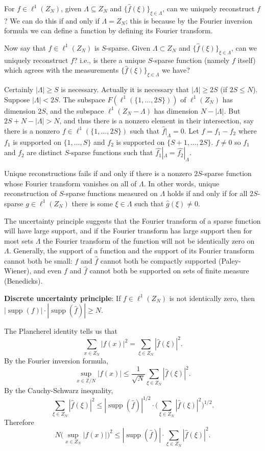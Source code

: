 \documentclass{article}
\DeclareMathOperator{\supp}{supp}
\begin{document}
For $f \in \ell^1(Z_N)$, given $\Lambda \subseteq Z_N$
and $\{\hat{f}(\xi)\}_{\xi \in \Lambda}$,
can we uniquely reconstruct $f$? We can do this if and only if
$\Lambda=Z_N$; this is because by the Fourier inversion formula
we can define a function by defining its Fourier transform.

Now say that $f \in \ell^1(Z_N)$ is $S$-sparse. Given 
$\Lambda \subset Z_N$ and $\{\hat{f}(\xi)\}_{\xi \in \Lambda}$,
can we uniquely reconstruct $f$? i.e., is there a unique $S$-sparse
function (namely $f$ itself) which agrees with the measurements
$\{\hat{f}(\xi)\}_{\xi \in \Lambda}$ we have?

Certainly $|\Lambda| \geq S$ is necessary. Actually
it is necessary that $|\Lambda|\geq 2S$ (if $2S \leq N$).
Suppose $|\Lambda|<2S$.
The subspace $F(\ell^1(\{1,\ldots,2S\}))$ of $\ell^1(Z_N)$
has dimension $2S$, and the subspace $\ell^1(Z_N-\Lambda)$ has
dimension $N-|\Lambda|$. 
But $2S+N-|\Lambda|>N$, and thus there is a nonzero
element in their intersection, say there is a nonzero $f \in \ell^1(\{1,\ldots,2S\})$ such that $\hat{f}|_{\Lambda}=0$.
Let $f=f_1-f_2$ where $f_1$ is supported on $\{1,\ldots,S\}$ and
$f_2$ is supported on $\{S+1,\ldots,2S\}$. $f \neq 0$ so $f_1$ and $f_2$
are distinct $S$-sparse functions such that $\hat{f_1}|_{\Lambda}
=\hat{f_2}|_{\Lambda}$.

Unique reconstructions fails if and only if there is a nonzero
$2S$-sparse function whose Fourier transform vanishes on all of $\Lambda$.
In other words,
unique reconstruction of $S$-sparse functions measured
on $\Lambda$ holds if and only if for all $2S$-sparse $g \in \ell^1(Z_N)$
there is some $\xi \in \Lambda$ such that $\hat{g}(\xi) \neq 0$.

The uncertainty principle suggests that the Fourier transform of
a
sparse function will have large support, and if the Fourier transform
has large support then for most sets $\Lambda$ the Fourier transform
of the function will not be identically zero on $\Lambda$.
Generally, the support of a function and the support of its Fourier
transform cannot both be small: $f$ and $\hat{f}$
cannot both be compactly supported (Paley-Wiener),
and even $f$ and $\hat{f}$ cannot both be supported on sets
of finite measure (Benedicks).

\textbf{Discrete uncertainty principle}: If $f \in \ell^1(Z_N)$ is not
identically zero, then $|\supp(f)|\cdot |\supp(\hat{f})| \geq N$.

The Plancherel identity tells us that
\[
\sum_{x \in Z_N} |f(x)|^2 = \sum_{\xi \in Z_N}|\hat{f}(\xi)|^2.
\]
By the Fourier inversion formula,
\[
\sup_{x \in \mathbb{Z}/N}|f(x)| \leq \frac{1}{\sqrt{N}}\sum_{\xi \in Z_N}|\hat{f}(\xi)|^2.
\]
By the Cauchy-Schwarz inequality,
\[
\sum_{\xi \in Z_N}|\hat{f}(\xi)|^2 \leq |\supp(\hat{f})|^{1/2}
\cdot \bigg(\sum_{\xi \in Z_N}|\hat{f}(\xi)|^2\bigg)^{1/2}.
\]
Therefore 
\[
N\bigg(\sup_{x \in Z_N} |f(x)| \bigg)^2 \leq
|\supp(\hat{f})|
\cdot \sum_{\xi \in Z_N}|\hat{f}(\xi)|^2.
\]
\end{document}
